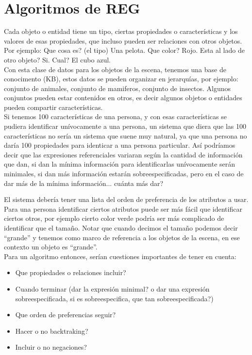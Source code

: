\section{Algoritmos de REG}

Cada objeto o entidad tiene un tipo, ciertas propiedades o caracter\'isticas y los valores de esas propiedades, que incluso pueden ser relaciones con otros objetos. \\

Por ejemplo: Que cosa es? (el tipo) Una pelota. Que color? Rojo. Esta al lado de otro objeto? Si. Cual? El cubo azul.\\

Con esta clase de datos para los objetos de la escena, tenemos una base de conocimento (KB), estos datos se pueden organizar en jerarqu\'ias, por ejemplo: conjunto de animales, conjunto de mamiferos, conjunto de insectos. Algunos conjuntos pueden estar contenidos en otros, es decir algunos objetos o entidades pueden compartir caracter\'isticas.\\

Si tenemos 100 caracter\'isticas de una persona, y con esas caracter\'isticas se pudiera identificar un\'ivocamente a una persona, un sistema que diera que las 100 caracter\'isticas no ser\'ia un sistema que suene muy natural, ya que una persona no dar\'ia 100 propiedades para identicar a una persona particular. As\'i podr\'iamos decir que las expresiones referenciales variaran seg\'un la cantidad de informaci\'on que dan, si dan la m\'inima informaci\'on para identificarlas un\'ivocamente ser\'an minimales, si dan m\'as informaci\'on estar\'an sobreespecificadas, pero en el caso de dar m\'as de la m\'inima informaci\'on... cu\'anta m\'as dar?

El sistema deber\'ia tener una lista del orden de preferencia de los atributos a usar.\\ 

Para una persona identificar ciertos atributos puede ser m\'as f\'acil que identificar ciertos otros, por ejemplo cierto color verde podr\'{i}a ser m\'as complicado de identificar que el tama\~no. Notar que cuando decimos el tama\~no podemos decir ``grande'' y tenemos como marco de referencia a los objetos de la escena, en ese contexto un objeto es ``grande''.\\

Para un algoritmo entonces, ser\'ian cuestiones importantes de tener en cuenta:

\begin{itemize}
 \item Que propiedades o relaciones incluir?
 \item Cuando terminar (dar la expresi\'on minimal? o dar una expresi\'on sobreespecificada, si es sobreespecifica, que tan sobreespecificada?)
 \item Que orden de preferencias seguir?
 \item Hacer o no backtraking?
 \item Incluir o no negaciones?
\end{itemize}



